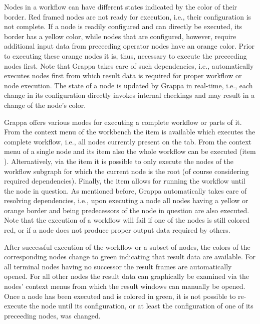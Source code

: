 Nodes in a workflow can have different states indicated by the color of their border. 
Red framed nodes are not ready for execution, i.e., their configuration is not
complete. If a node is readily configured and can directly be executed, its
border has a yellow color, while nodes that are configured, however, require
additional input data from preceeding operator nodes have an orange color.
Prior to executing these orange nodes it is, thus, necessary to execute the
preceeding nodes first.
Note that Grappa takes care of such dependencies, i.e., automatically executes
nodes first from which result data is required for proper workflow or node
execution. The state of a node is updated by Grappa in real-time, i.e., each
change in its configuration directly invokes internal checkings and may result in a change of the node's color.

Grappa offers various modes for executing a
complete workflow or parts of it.
From the context menu of the workbench the item 
 is available which executes the complete workflow, i.e., all nodes
currently present on the tab. From the context menu of a single node and its  item also the whole workflow can be executed (item ).
Alternatively, via the item  it is possible to only execute the nodes of the workflow subgraph for which the 
current node is the root (of course considering required dependencies). Finally, the item  allows for running the workflow
until the node in question. As mentioned before, Grappa automatically takes care
of resolving dependencies, i.e., upon executing a node all nodes having a yellow
or orange border and being predecessors of the node in question are also executed. Note that the execution of a workflow will fail if one of the nodes is still colored red, or if a node does not produce proper output data required by others. 

After successful execution of the workflow or a subset of nodes, the colors of
the corresponding nodes change to green indicating that result data are
available. For all terminal nodes having no successor the result frames are
automatically opened.
For all other nodes the result data can graphically be examined via the nodes'
context menus from which the result windows can manually be opened. 
Once a node has been executed and is colored in green, it is not possible to
re-execute the node until its configuration, or at least the configuration of
one of its preceeding nodes, was changed.

